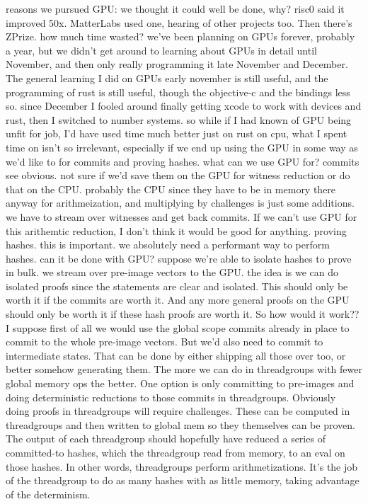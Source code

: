 reasons we pursued GPU:
    we thought it could well be done, why?
    risc0 said it improved 50x. MatterLabs used one, hearing of other projects too. Then there's ZPrize. 
how much time wasted?
    we've been planning on GPUs forever, probably a year, but we didn't get around to learning about GPUs in detail until November, and then only really programming it late November and December. The general learning I did on GPUs early november is still useful, and the programming of rust is still useful, though the objective-c and the bindings less so. since December I fooled around finally getting xcode to work with devices and rust, then I switched to number systems.
    so while if I had known of GPU being unfit for job, I'd have used time much better just on rust on cpu, what I spent time on isn't so irrelevant, especially if we end up using the GPU in some way as we'd like to for commits and proving hashes. 
what can we use GPU for?
    commits see obvious. not sure if we'd save them on the GPU for witness reduction or do that on the CPU. probably the CPU since they have to be in memory there anyway for arithmeization, and multiplying by challenges is just some additions. we have to stream over witnesses and get back commits. If we can't use GPU for this arithemtic reduction, I don't think it would be good for anything. 
    proving hashes. this is important. we absolutely need a performant way to perform hashes. can it be done with GPU? suppose we're able to isolate hashes to prove in bulk. we stream over pre-image vectors to the GPU. the idea is we can do isolated proofs since the statements are clear and isolated. 
        This should only be worth it if the commits are worth it. And any more general proofs on the GPU should only be worth it if these hash proofs are worth it. 
        So how would it work??
        I suppose first of all we would use the global scope commits already in place to commit to the whole pre-image vectors. But we'd also need to commit to intermediate states. That can be done by either shipping all those over too, or better somehow generating them.
        The more we can do in threadgroups with fewer global memory ops the better. 
        One option is only committing to pre-images and doing deterministic reductions to those commits in threadgroups.
        Obviously doing proofs in threadgroups will require challenges. These can be computed in threadgroups and then written to global mem so they themselves can be proven. 
        The output of each threadgroup should hopefully have reduced a series of committed-to hashes, which the threadgroup read from memory, to an eval on those hashes. In other words, threadgroups perform arithmetizations. It's the job of the threadgroup to do as many hashes with as little memory, taking advantage of the determinism. 
